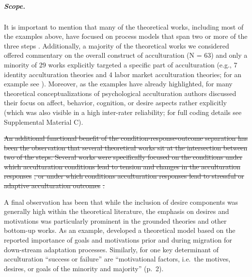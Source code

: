 \documentclass[man, 12pt, a4paper, mask]{apa7}
\newcommand{\fgrref}[2][]{\hyperref[#2]{Figure \ref*{#2}#1}}
\providecommand{\DIFdeltex}[1]{{\protect\color{red}\sout{#1}}}                      %
\providecommand{\DIFdelbegin}{} %
\providecommand{\DIFdelend}{} %
\providecommand{\DIFdel}[1]{\texorpdfstring{\DIFdeltex{#1}}{}} %
\newcommand{\DIFscaledelfig}{0.5}
\newlength{\DIFdelgraphicswidth} %
\newlength{\DIFdelgraphicsheight} %
\newcommand{\DIFdelincludegraphics}[2][]{%
\sbox{\DIFdelgraphicsbox}{\DIFOincludegraphics[#1]{#2}}%
\settoboxwidth{\DIFdelgraphicswidth}{\DIFdelgraphicsbox} %
\settoboxtotalheight{\DIFdelgraphicsheight}{\DIFdelgraphicsbox} %
\scalebox{\DIFscaledelfig}{%
\parbox[b]{\DIFdelgraphicswidth}{\usebox{\DIFdelgraphicsbox}\\[-\baselineskip] \rule{\DIFdelgraphicswidth}{0em}}\llap{\resizebox{\DIFdelgraphicswidth}{\DIFdelgraphicsheight}{%
\setlength{\unitlength}{\DIFdelgraphicswidth}%
\begin{picture}(1,1)%
\thicklines\linethickness{2pt} %
{\color[rgb]{1,0,0}\put(0,0){\framebox(1,1){}}}%
{\color[rgb]{1,0,0}\put(0,0){\line( 1,1){1}}}%
{\color[rgb]{1,0,0}\put(0,1){\line(1,-1){1}}}%
\end{picture}%
}\hspace*{3pt}}} %
} %
\DeclareRobustCommand{\DIFdelbegin}{\DIFOdelbegin \let\includegraphics\DIFdelincludegraphics} %
\DeclareRobustCommand{\DIFdelend}{\DIFOaddend \let\includegraphics\DIFOincludegraphics} %
\begin{document}
\subparagraph{Scope.}

It is important to mention that many of the theoretical works, including
most of the examples above, have focused on process models that span two
or more of the three steps
\citep[e.g.,][]{Berry1992, Ward2016, Arends-Toth2006a, Rogler1994}.
Additionally, a majority of the theoretical works we considered offered
commentary on the overall construct of acculturation (N = 63) and only a
minority of 29 works explicitly targeted a specific part of
acculturation (e.g., 7 identity acculturation theories and 4 labor
market acculturation theories; for an example see
\citealp{Weinreich2009}). Moreover, as the examples have already
highlighted, for many theoretical conceptualizations of psychological
acculturation authors discussed their focus on affect, behavior,
cognition, or desire aspects rather explicitly (which was also visible
in a high inter-rater reliability; for full coding details see
Supplemental Material C).

\DIFdelbegin \DIFdel{An additional functional benefit of the condition-response-outcome
separation has been the observation that several theoretical works sit
at the intersection between two of the steps. Several works were
specifically focused on the conditions under which acculturation
conditions lead to tension and changes in the acculturation responses
}%
\DIFdel{,
or under which conditions acculturation responses lead to stressful or
adaptive acculturation outcomes
}%
\DIFdel{.
}%

\DIFdelend A final observation has been that while the inclusion of desire
components was generally high within the theoretical literature, the
emphasis on desires and motivations was particularly prominent in the
grounded theories and other bottom-up works. As an example,
\citet[][]{Kim2019} developed a theoretical model based on the reported
importance of goals and motivations prior and during migration for
down-stream adaptation processes. Similarly, for
\citet[][]{Mchitarjan2015} one key determinant of acculturation
``success or failure'' are ``motivational factors, i.e.~the motives,
desires, or goals of the minority and majority'' (p.~2).
\end{document}
